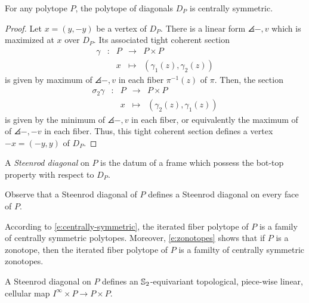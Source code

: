\begin{proposition}
	For any polytope $P$, the polytope of diagonals $D_P$ is centrally symmetric.
\end{proposition}

\begin{proof}
	Let $x=(y,-y)$ be a vertex of $D_P$.
	There is a linear form $\angles{-,v}$ which is maximized at $x$ over $D_P$.
	Its associated tight coherent section
	\begin{equation*}
		\begin{matrix}
			\gamma & : & P & \to & P \times P \\
			& & x  & \mapsto & (\gamma_1(z),\gamma_2(z))
		\end{matrix}
	\end{equation*}
	is given by maximum of $\angles{-,v}$ in each fiber $\pi^{-1}(z)$ of $\pi$. Then, the section
	\begin{equation*}
		\begin{matrix}
			\sigma_2\gamma & : & P & \to & P \times P \\
			& & x  & \mapsto & (\gamma_2(z),\gamma_1(z))
		\end{matrix}
	\end{equation*}
	is given by the minimum of $\angles{-,v}$ in each fiber, or equivalently the maximum of of $\angles{-,-v}$ in each fiber.
	Thus, this tight coherent section defines a vertex $-x=(-y,y)$ of $D_P$.
\end{proof}

\begin{definition}
	A \emph{Steenrod diagonal} on $P$ is the datum of a frame which possess the bot-top property with respect to $D_P$.
\end{definition}

Observe that a Steenrod diagonal of $P$ defines a Steenrod diagonal on every face of $P$. 

According to \cref{e:centrally-symmetric}, the iterated fiber polytope of $P$ is a family of centrally symmetric polytopes. 
Moreover, \cref{e:zonotopes} shows that if $P$ is a zonotope, then the iterated fiber polytope of $P$ is a familty of centrally symmetric zonotopes. 

\begin{theorem}
	A Steenrod diagonal on $P$ defines an $\mathbb{S}_2$-equivariant topological, piece-wise linear, cellular map $I^\infty \times P \to P \times P$.
\end{theorem}

